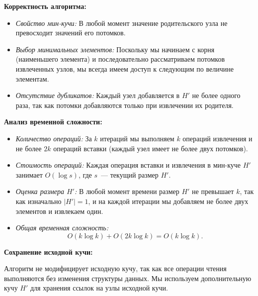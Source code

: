 \documentclass[11pt]{article}
\begin{document}
\begin{solution}
    \textbf{Корректность алгоритма:}

    \begin{itemize}
        \item \textit{Свойство мин-кучи:} В любой момент значение родительского узла не превосходит значений его потомков.
        \item \textit{Выбор минимальных элементов:} Поскольку мы начинаем с корня (наименьшего элемента) и последовательно рассматриваем потомков извлеченных узлов, мы всегда имеем доступ к следующим по величине элементам.
        \item \textit{Отсутствие дубликатов:} Каждый узел добавляется в $H'$ не более одного раза, так как потомки добавляются только при извлечении их родителя.
    \end{itemize}

    \textbf{Анализ временной сложности:}

    \begin{itemize}
        \item \textit{Количество операций:} За $k$ итераций мы выполняем $k$ операций извлечения и не более $2k$ операций вставки (каждый узел имеет не более двух потомков).
        \item \textit{Стоимость операций:} Каждая операция вставки и извлечения в мин-куче $H'$ занимает $O(\log s)$, где $s$~--- текущий размер $H'$.
        \item \textit{Оценка размера $H'$:} В любой момент времени размер $H'$ не превышает $k$, так как изначально $|H'| = 1$, и на каждой итерации мы добавляем не более двух элементов и извлекаем один.
        \item \textit{Общая временная сложность:}
              \[
                  O(k \log k) + O(2k \log k) = O(k \log k).
              \]
    \end{itemize}

    \textbf{Сохранение исходной кучи:}

    Алгоритм не модифицирует исходную кучу, так как все операции чтения выполняются без изменения структуры данных. Мы используем дополнительную кучу $H'$ для хранения ссылок на узлы исходной кучи.
\end{solution}
\end{document}
